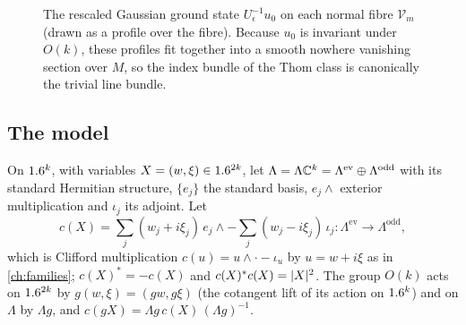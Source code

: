 \begin{figure}[ht]
\centering
{}
\caption[The bundle of ground states]{The rescaled Gaussian ground state
$U_\epsilon^{-1}u_0$ on each normal fibre $\mathcal V_m$ (drawn as a profile
over the fibre). Because $u_0$ is invariant under $O(k)$, these profiles fit
together into a smooth nowhere vanishing section over $M$, so the index bundle of
the Thom class is canonically the trivial line bundle.}
\label{scindex:fig:gaussian}
\end{figure}

\subsection{The model}
On $1.6^k$, with variables $X=(w,\xi)\in1.6^{2k}$, let $\Lambda=\Lambda\mathbb{C}^k=
\Lambda^{\mathrm{ev}}\oplus\Lambda^{\mathrm{odd}}$ with its standard Hermitian
structure, $\{e_j\}$ the standard basis, $e_j\wedge$ exterior multiplication and
$\iota_j$ its adjoint. Let
\begin{equation*}
  c(X)=\sum_j(w_j+i\xi_j)\,e_j\wedge-\sum_j(w_j-i\xi_j)\,\iota_j
  :\Lambda^{\mathrm{ev}}\longrightarrow\Lambda^{\mathrm{odd}},
\end{equation*}
which is Clifford multiplication $c(u)=u\wedge\cdot-\iota_u$ by $u=w+i\xi$ as in
\cref{ch:families}; $c(X)^*=-c(X)$ and $c(X)^*c(X)=\lvert X\rvert^2$. The group $O(k)$
acts on $1.6^{2k}$ by $g(w,\xi)=(gw,g\xi)$ (the cotangent lift of its action on
$1.6^k$) and on $\Lambda$ by $\Lambda g$, and $c(gX)=\Lambda g\,c(X)\,
(\Lambda g)^{-1}$.

